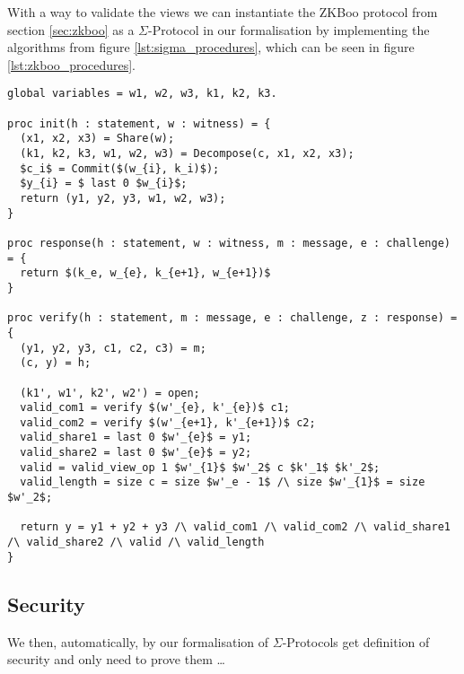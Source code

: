 With a way to validate the views we can instantiate the ZKBoo protocol from
section \ref{sec:zkboo} as a $\Sigma$-Protocol in our formalisation by
implementing the algorithms from figure \ref{lst:sigma_procedures}, which can be
seen in figure \ref{lst:zkboo_procedures}.

\begin{lstlisting}[float, mathescape,label=lst:zkboo_procedures,caption= ZKBoo $\Sigma$-Protocol instantiation]
global variables = w1, w2, w3, k1, k2, k3.

proc init(h : statement, w : witness) = {
  (x1, x2, x3) = Share(w);
  (k1, k2, k3, w1, w2, w3) = Decompose(c, x1, x2, x3);
  $c_i$ = Commit($(w_{i}, k_i)$);
  $y_{i} = $ last 0 $w_{i}$;
  return (y1, y2, y3, w1, w2, w3);
}

proc response(h : statement, w : witness, m : message, e : challenge) = {
  return $(k_e, w_{e}, k_{e+1}, w_{e+1})$
}

proc verify(h : statement, m : message, e : challenge, z : response) = {
  (y1, y2, y3, c1, c2, c3) = m;
  (c, y) = h;

  (k1', w1', k2', w2') = open;
  valid_com1 = verify $(w'_{e}, k'_{e})$ c1;
  valid_com2 = verify $(w'_{e+1}, k'_{e+1})$ c2;
  valid_share1 = last 0 $w'_{e}$ = y1;
  valid_share2 = last 0 $w'_{e}$ = y2;
  valid = valid_view_op 1 $w'_{1}$ $w'_2$ c $k'_1$ $k'_2$;
  valid_length = size c = size $w'_e - 1$ /\ size $w'_{1}$ = size $w'_2$;

  return y = y1 + y2 + y3 /\ valid_com1 /\ valid_com2 /\ valid_share1 /\ valid_share2 /\ valid /\ valid_length
}

\end{lstlisting}

\subsection{Security}
\label{subsec:zkboo:sec}
We then, automatically, by our formalisation of $\Sigma$-Protocols get
definition of security and only need to prove them \dots {}

